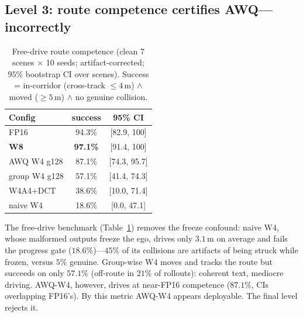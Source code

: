\documentclass[conference]{IEEEtran}
\begin{document}
\subsection{Level 3: route competence certifies AWQ---incorrectly}
\label{sec:competence}
\begin{table}[t]\centering
\caption{Free-drive route competence (clean 7 scenes $\times$ 10 seeds; artifact-corrected;
$95\%$ bootstrap CI over scenes). Success = in-corridor (cross-track $\le4$\,m) $\wedge$
moved ($\ge5$\,m) $\wedge$ no genuine collision.}
\label{tab:freedrive}
\begin{tabular}{lcc}
\toprule
Config & success & 95\% CI \\
\midrule
FP16              & 94.3\% & [82.9, 100] \\
\textbf{W8}       & \textbf{97.1\%} & [91.4, 100] \\
AWQ W4 g128       & 87.1\% & [74.3, 95.7] \\
group W4 g128     & 57.1\% & [41.4, 74.3] \\
W4A4+DCT          & 38.6\% & [10.0, 71.4] \\
naive W4          & 18.6\% & [0.0, 47.1] \\
\bottomrule
\end{tabular}
\end{table}
The free-drive benchmark (Table~\ref{tab:freedrive}) removes the freeze confound: naive W4,
whose malformed outputs freeze the ego, drives only $3.1$\,m on average and fails the
progress gate ($18.6\%$)---$45\%$ of its collisions are artifacts of being struck while
frozen, versus $5\%$ genuine. Group-wise W4 moves and tracks the route but succeeds on only
$57.1\%$ (off-route in $21\%$ of rollouts): coherent text, mediocre driving. AWQ-W4, however,
drives at near-FP16 competence ($87.1\%$, CIs overlapping FP16's). By this metric AWQ-W4
appears deployable. The final level rejects it.
\end{document}
